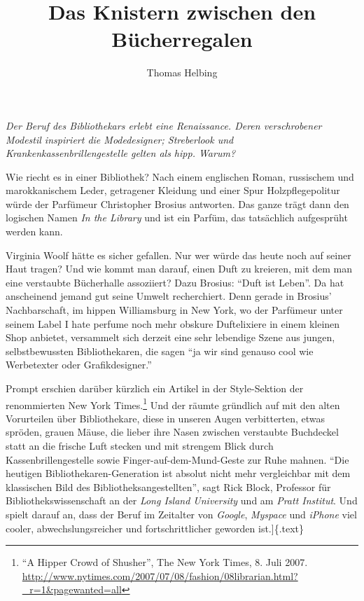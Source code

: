 \documentclass[output=paper]{langscibook}
\title{Das Knistern zwischen den Bücherregalen}
\author{Thomas Helbing}
\begin{document}
\maketitle
\noindent \emph{Der Beruf des Bibliothekars erlebt eine Renaissance. Deren
verschrobener Modestil inspiriert die Modedesigner; Streberlook und
Krankenkassenbrillengestelle gelten als hipp. Warum?}

\vspace{1.5em}

\noindent Wie riecht es in einer Bibliothek? Nach einem englischen Roman,
russischem und marokkanischem Leder, getragener Kleidung und einer Spur
Holzpflegepolitur würde der Parfümeur Christopher Brosius antworten. Das
ganze trägt dann den logischen Namen \emph{In the Library} und ist ein
Parfüm, das tatsächlich aufgesprüht werden kann.

Virginia Woolf hätte es sicher gefallen. Nur wer würde das heute noch
auf seiner Haut tragen? Und wie kommt man darauf, einen Duft zu
kreieren, mit dem man eine verstaubte Bücherhalle assoziiert? Dazu
Brosius: ``Duft ist Leben''. Da hat anscheinend jemand gut seine Umwelt
recherchiert. Denn gerade in Brosius' Nachbarschaft, im hippen
Williamsburg in New York, wo der Parfümeur unter seinem Label I hate
perfume noch mehr obskure Duftelixiere in einem kleinen Shop anbietet,
versammelt sich derzeit eine sehr lebendige Szene aus jungen,
selbstbewussten Bibliothekaren, die sagen ``ja wir sind genauso cool wie
Werbetexter oder Grafikdesigner.''

\noindent Prompt erschien darüber kürzlich ein Artikel in der Style-Sektion der
renommierten New York Times.\footnote{``A Hipper Crowd of Shusher'', The
  New York Times, 8. Juli 2007.
  \url{http://www.nytimes.com/2007/07/08/fashion/08librarian.html?_r=1\&pagewanted=all}}
Und der räumte gründlich auf mit den alten Vorurteilen über
Bibliothekare, diese in unseren Augen verbitterten, etwas spröden,
grauen Mäuse, die lieber ihre Nasen zwischen verstaubte Buchdeckel statt
an die frische Luft stecken und mit strengem Blick durch
Kassenbrillengestelle sowie Finger-auf-dem-Mund-Geste zur Ruhe mahnen.
``Die heutigen Bibliothekaren-Generation ist absolut nicht mehr
vergleichbar mit dem klassischen Bild des Bibliotheksangestellten'',
sagt Rick Block, Professor für Bibliothekswissenschaft an der \emph{Long
Island University} und am \emph{Pratt Institut}. Und spielt darauf an,
dass der Beruf im Zeitalter von \emph{Google}, \emph{Myspace} und
\emph{iPhone} viel cooler, abwechslungsreicher und fortschrittlicher
geworden ist.{]}\{.text\}
\end{document}
